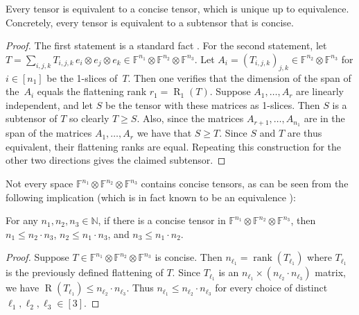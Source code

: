 \documentclass{daj}
\DeclareMathOperator{\tensorrank}{R}
\newcommand{\FF}{\mathbb{F}}
\newcommand{\NN}{\mathbb{N}}
\DeclareMathOperator{\rank}{rank} \DeclareMathOperator{\col}{colspan}
\begin{document}
\begin{lemma}\label{lem:equiv-concise}
    Every tensor is equivalent to a concise tensor, which is unique up to equivalence. Concretely, every tensor is equivalent to a subtensor that is concise.
\end{lemma}
\begin{proof}
    The first statement is a standard fact \cite[Section 14.3]{burgisser1997algebraic}. For the second statement, let $T = \sum_{i,j,k} T_{i,j,k}\, e_i \otimes e_j \otimes e_k \in \FF^{n_1} \otimes \FF^{n_2} \otimes \FF^{n_3}$. Let $A_i = (T_{i,j,k})_{j,k} \in \FF^{n_2} \otimes \FF^{n_3}$ for $i \in [n_1]$ be the 1-slices of~$T$. Then one verifies that the dimension of the span of the~$A_i$ equals the flattening rank $r_1=\tensorrank_1(T)$. Suppose $A_1, \ldots, A_r$ are linearly independent, and let $S$ be the tensor with these matrices as 1-slices. Then $S$ is a subtensor of $T$ so clearly $T \geq S$. Also, since the matrices $A_{r+1}, \ldots, A_{n_1}$ are in the span of the matrices $A_1, \ldots, A_r$ we have that $S \geq T$. Since $S$ and $T$ are thus equivalent, their flattening ranks are equal. Repeating this construction for the other two directions gives the claimed subtensor.
\end{proof}

Not every space $\FF^{n_1} \otimes \FF^{n_2} \otimes \FF^{n_3}$ contains concise tensors, as can be seen from the following implication (which is in fact known to be an equivalence \cite[Theorem~2]{MR2776439}):

\begin{lemma}\label{cl:concise-formats}
For any $n_1,n_2,n_3\in\NN$, if there is a concise tensor in $\FF^{n_1} \otimes \FF^{n_2} \otimes \FF^{n_3}$, then $n_1 \leq n_2\cdot n_3$, $n_2 \leq n_1\cdot n_3$, and $n_3 \leq n_1\cdot n_2$.
\end{lemma}
\begin{proof}
    Suppose $T \in \FF^{n_1} \otimes \FF^{n_2} \otimes \FF^{n_3}$ is concise. Then $n_{\ell_1} = \rank(T_{\ell_1})$ where $T_{\ell_1}$ is the previously defined flattening of $T$. Since $T_{\ell_1}$ is an $n_{\ell_1} \times (n_{\ell_2}\cdot n_{\ell_3})$ matrix, we have $\tensorrank(T_{\ell_1}) \leq n_{\ell_2} \cdot n_{\ell_3}$. Thus $n_{\ell_1} \leq n_{\ell_2} \cdot n_{\ell_3}$ for every choice of distinct ${\ell_1},{\ell_2},{\ell_3} \in [3]$.
\end{proof}
%
%
%
%
\end{document}

